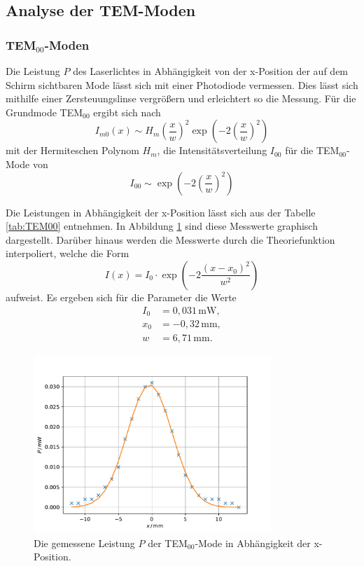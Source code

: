 \subsection{Analyse der TEM-Moden}
\subsubsection{TEM$_{00}$-Moden}
Die Leistung $P$ des Laserlichtes in Abhängigkeit von der x-Position der auf dem Schirm sichtbaren Mode lässt sich mit
einer Photodiode vermessen. Dies lässt sich mithilfe einer Zersteuungslinse vergrößern und erleichtert so die Messung.
Für die Grundmode TEM$_{00}$ ergibt sich nach
\begin{equation}
    I_{m0}(x)\sim H_m \left(\frac{x}{w}\right)^2\exp\left(-2\left(\frac{x}{w}\right)^2\right)
\end{equation}
mit der Hermiteschen Polynom $H_m$, die Intensitätsverteilung $I_{00}$ für die TEM$_{00}$-Mode von
\begin{equation}
    I_{00}\sim \exp\left(-2\left(\frac{x}{w}\right)^2\right)
\end{equation}

Die Leistungen in Abhängigkeit der x-Position lässt sich aus der Tabelle \ref{tab:TEM00} entnehmen.
In Abbildung \ref{fig:TEM00} sind diese Messwerte graphisch dargestellt. Darüber hinaus werden die Messwerte durch 
die Theoriefunktion interpoliert, welche die Form
\begin{equation}
    I(x)=I_0\cdot \exp\left(-2\frac{(x-x_0)^2}{w^2}\right)
\end{equation}
aufweist.
Es ergeben sich für die Parameter die Werte
\begin{align*}
    I_0&=0,031\,\text{mW}{,}\\
    x_0&=-0,32\,\text{mm}{,}\\
    w&=6,71\,\text{mm}.
\end{align*}
\begin{figure}
    \center
    \includegraphics[width=0.8\textwidth]{plots/TEM00.pdf}
    \caption{Die gemessene Leistung $P$ der TEM$_{00}$-Mode in Abhängigkeit der x-Position.}
    \label{fig:TEM00}
\end{figure}


